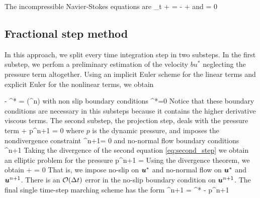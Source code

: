 \documentclass[11pt]{article}
\begin{document}
The incompressible Navier-Stokes equations are
\beq
\label{eq:ns_2}
\p_t  + \cdot \nabla {} = - + \nu \lap {}\com
\eeq
and
\beq
\label{eq:cons_mass_2}
\nabla\cdot{} = 0\per
\eeq


\subsection{Fractional step method}
In this approach, we split every time integration step in two substeps. In the first substep, we perfom
 a preliminary estimation of the velocity $bu^*$ neglecting the pressure term altogether. Using an implicit 
  Euler scheme for the linear terms and explicit Euler for the nonlinear terms, we obtain
 
\beq
\label{eq:first_step}
 - \nu \lap \bu^*   = \bN(\bu^n)\com\qquad {} \qquad \Omega\com
\eeq
with non slip boundary conditions
\beq
\label{eq:first_bc}
\bu^*=0\com\qquad {} \qquad  \partial \Omega\per
\eeq
Notice that these boundary conditions are necessary in this substeps because it contains the higher derivative
 viscous terms. The second substep, the projection step, deals with the pressure term
\beq
\label{eq:second_step}
 + \nabla p^{n+1} = 0\com
\eeq
where $p$ is the dynamic pressure, and imposes the nondivergence constraint
\beq
    \label{eq:second_nd}
    \nabla\cdot\bu^{n+1}= 0\com
\eeq
and no-normal flow boundary conditions
\beq
\label{eq:second_bc}
\bu^{n+1}\cdot {}\com \qquad {}  \qquad \p \Omega\per
\eeq
Taking the divergence of the second equation \eqref{eq:second_step} we obtain an elliptic problem for the pressure
\beq
\label{eq:elliptic_pressure}
\lap p^{n+1} = \frac{\nabla\cdot \bu^{*}}{\dt}\com
\eeq
Using the divergence theorem, we obtain
\beq
{} +  = 0\com \qquad {}  \qquad \p \Omega\per
\eeq
That is, we impose no-slip on $\boldsymbol{u}^*$ and no-normal flow on $\boldsymbol{u}^*$ and $\boldsymbol{u}^{n+1}$. There is an $\mathcal{O}(\Delta t)$ error in the no-slip boundary condition on $\boldsymbol{u}^{n+1}$. The final single time-step  marching scheme has the form
\beq
\label{eq:full_step}
\bu^{n+1} = \bu^* - \nabla p^{n+1} \dt\per
\eeq
\end{document}

